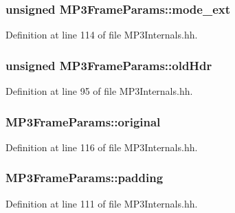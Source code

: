 \subsubsection[{mode\+\_\+ext}]{\setlength{\rightskip}{0pt plus 5cm}unsigned M\+P3\+Frame\+Params\+::mode\+\_\+ext\hspace{0.3cm}{\ttfamily [private]}}\label{classMP3FrameParams_aafd34b224aabcfb2f2b2bc3224a627d0}


Definition at line 114 of file M\+P3\+Internals.\+hh.

\subsubsection[{old\+Hdr}]{\setlength{\rightskip}{0pt plus 5cm}unsigned M\+P3\+Frame\+Params\+::old\+Hdr}\label{classMP3FrameParams_a425e8321d521693b24d958da466c7489}


Definition at line 95 of file M\+P3\+Internals.\+hh.

\subsubsection[{original}]{ M\+P3\+Frame\+Params\+::original\hspace{0.3cm}{\ttfamily [private]}}\label{classMP3FrameParams_af671ffc5fdd0f49d6ec79d6971fcbda4}


Definition at line 116 of file M\+P3\+Internals.\+hh.

\subsubsection[{padding}]{ M\+P3\+Frame\+Params\+::padding\hspace{0.3cm}{\ttfamily [private]}}\label{classMP3FrameParams_ae5743b41d64a03a8953f11746952eadf}


Definition at line 111 of file M\+P3\+Internals.\+hh.

